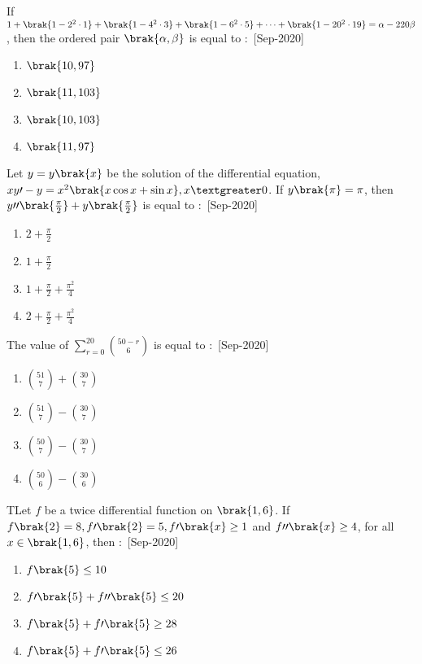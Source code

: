 \iffalse
\title{2020}
\author{EE24BTECH11021}
\section{mcq-single}
\fi
    \item If $1+\brak{1-2^2\cdot1}+\brak{1-4^2\cdot3}+\brak{1-6^2\cdot5}+\dots +\brak{1-20^2\cdot 19}=\alpha-220\beta$, then the ordered pair $\brak{\alpha,\beta}$ is equal to $\colon$
    \hfill{[Sep-2020]}
        \begin{enumerate}
            \item $\brak{10,97}$
            \item $\brak{11,103}$
            \item $\brak{10,103}$
            \item $\brak{11,97}$
        \end{enumerate}
    \item Let $y=y\brak{x}$ be the solution of the differential equation, $xy\prime-y=x^2\brak{x\cos{x}+\sin{x}},x\textgreater 0$. If $y\brak{\pi}=\pi$, then $y\prime\prime\brak{\frac{\pi}{2}}+y\brak{\frac{\pi}{2}}$ is equal to $\colon$
    \hfill{[Sep-2020]}
        \begin{enumerate}
            \item $2+\frac{\pi}{2}$
            \item $1+\frac{\pi}{2}$
            \item $1+\frac{\pi}{2}+\frac{\pi^2}{4}$
            \item $2+\frac{\pi}{2}+\frac{\pi^2}{4}$
        \end{enumerate}
    \item The value of $\sum_{r=0}^{20}\binom{50-r}{6}$ is equal to $\colon$
    \hfill{[Sep-2020]}
        \begin{enumerate}
            \item $\binom{51}{7}+\binom{30}{7}$
            \item $\binom{51}{7}-\binom{30}{7}$
            \item $\binom{50}{7}-\binom{30}{7}$
            \item $\binom{50}{6}-\binom{30}{6}$
        \end{enumerate}
    \item TLet $f$ be a twice differential function on $\brak{1,6}$. If $f\brak{2}=8,f\prime\brak{2}=5,f\prime\brak{x}\geq 1$ and $f\prime\prime\brak{x}\geq 4$, for all $x\in \brak{1,6}$, then $\colon$
    \hfill{[Sep-2020]}
        \begin{enumerate}
            \item $f\brak{5}\leq 10$
            \item $f\prime\brak{5}+f\prime\prime\brak{5}\leq 20$
            \item $f\brak{5}+f\prime\brak{5}\geq 28$
            \item $f\brak{5}+f\prime\brak{5}\leq 26$
        \end{enumerate}
